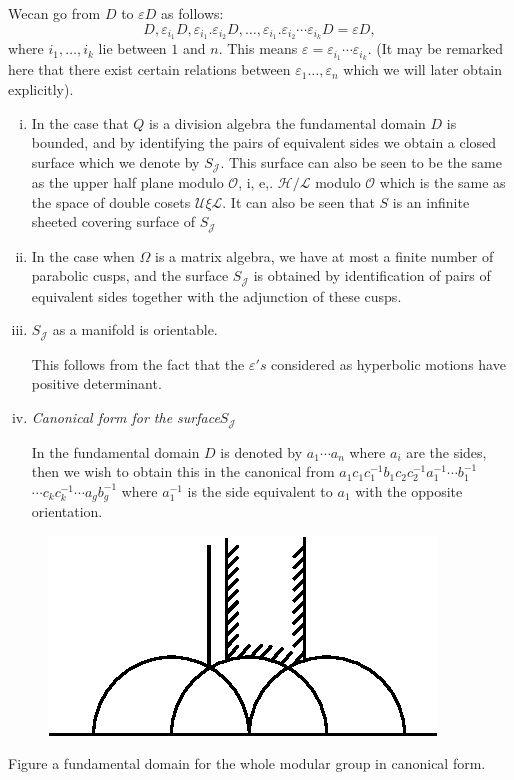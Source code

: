 We\pageoriginale can go from $D$ to $\varepsilon D$ as follows:
$$
D, \varepsilon_{i_1} D,  \varepsilon_{i_1}. \varepsilon_{i_2} D,
\ldots,  \varepsilon_{i_1}. \varepsilon_{i_2} \cdots \varepsilon
_{i_k} D = \varepsilon D,  
$$
where $i_1, \ldots,  i_k$ lie between $1$ and $n$. This means
$\varepsilon = \varepsilon_{i_1} \cdots \varepsilon_{i_k}$. (It may be
remarked here that there exist certain relations between $\varepsilon
_1 \ldots,  \varepsilon_n$ which we will later obtain explicitly).  
\begin{enumerate}[(i)]
\item In the case that $Q$ is a division algebra the fundamental
  domain $D$ is bounded, and by identifying the pairs of equivalent
  sides we obtain a closed surface which we denote by
  $S_{\mathcal{J}}$. This surface can also be seen to be the same as the
  upper half plane modulo $\mathscr{O}$, i, e,.  $\mathscr{H}/
  \mathcal{L}$ modulo $\mathscr{O}$ which is the same as the space of
  double cosets $\mathscr{U} \xi \mathcal{L}$. It can also be seen that
  $S$ is an infinite sheeted covering surface of $S_{\mathcal{J}}$ 
  
\item In the case when $\Omega$ is a matrix algebra, we have at most
  a finite number of parabolic cusps, and the surface $S_{\mathcal{J}}$
  is obtained by identification of pairs of equivalent sides together
  with the adjunction of these cusps.  

\item $S_{\mathcal{J}}$ as a manifold is orientable. 

  This follows from the fact that the $\varepsilon' s$ considered as
  hyperbolic motions have positive determinant.  
  
\item \textit{Canonical form for the surface}$S_{\mathcal{J}}$

  In the fundamental domain $D$ is denoted by $a_1 \cdots a_n$ where
  $a_i$ are the sides, then we wish to obtain this in the canonical from
  $a_1 c_1 c^{-1}_1 b_1 c_2 c_2^{-1} a^{-1}_1 \cdots b^{-1}_1$ $\cdots
  c_k c_k^{-1} \cdots 
  a_g b^{-1}_{g}$ where $a^{-1}_{1}$ is the side equivalent to $a_1$
  with the opposite orientation.  
\end{enumerate}

\begin{figure}[H]
\centerline{\includegraphics{vol9-figures/fig9-2.eps}}
\end{figure}
Figure a fundamental domain for the whole modular group in
  canonical form.

